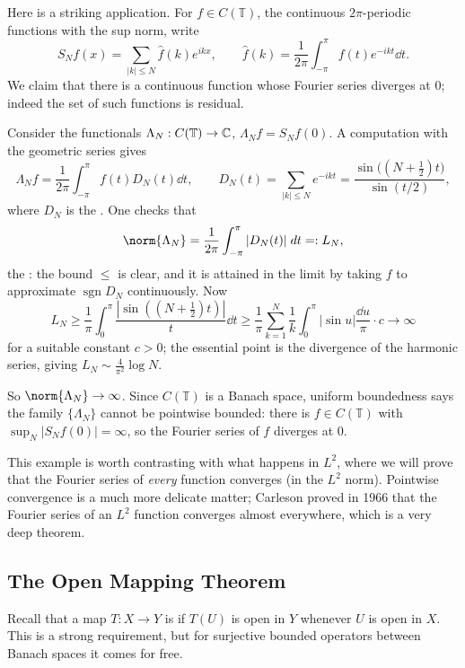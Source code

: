 \documentclass[a4paper]{scrartcl}
\DeclareMathOperator{\sgn}{sgn}
\begin{document}
\begin{example}
	Here is a striking application. For $f \in C(\mathbb{T})$, the continuous $2\pi$-periodic functions with the sup norm, write
	$$S_N f(x) = \sum_{|k| \leq N} \hat f(k) e^{ikx}, \qquad \hat f(k) = \frac{1}{2\pi}\int_{-\pi}^{\pi} f(t)e^{-ikt}\dd t.$$
	We claim that there is a continuous function whose Fourier series diverges at $0$; indeed the set of such functions is residual.

	Consider the functionals $\Lambda_N : C(\mathbb{T}) \to \mathbb{C}$, $\Lambda_N f = S_Nf(0)$. A computation with the geometric series gives
	$$\Lambda_N f = \frac{1}{2\pi}\int_{-\pi}^\pi f(t) D_N(t) \dd t, \qquad D_N(t) = \sum_{|k|\leq N}e^{-ikt} = \frac{\sin\big((N+\frac12)t\big)}{\sin(t/2)},$$
	where $D_N$ is the . One checks that
	$$\norm{\Lambda_N} = \frac{1}{2\pi}\int_{-\pi}^{\pi}|D_N(t)|\dd t =: L_N,$$
	the : the bound $\leq$ is clear, and it is attained in the limit by taking $f$ to approximate $\sgn D_N$ continuously. Now
	$$L_N \geq \frac{1}{\pi}\int_0^{\pi} \frac{|\sin((N+\frac12)t)|}{t}\dd t \geq \frac{1}{\pi}\sum_{k=1}^{N}\frac{1}{k}\int_{0}^{\pi}|\sin u| \frac{\dd u}{\pi} \cdot c \longrightarrow \infty$$
	for a suitable constant $c > 0$; the essential point is the divergence of the harmonic series, giving $L_N \sim \frac{4}{\pi^2}\log N$.

	So $\norm{\Lambda_N} \to \infty$. Since $C(\mathbb{T})$ is a Banach space, uniform boundedness says the family $\{\Lambda_N\}$ cannot be pointwise bounded: there is $f \in C(\mathbb{T})$ with $\sup_N |S_Nf(0)| = \infty$, so the Fourier series of $f$ diverges at $0$.
\end{example}

\begin{remark}
	This example is worth contrasting with what happens in $L^2$, where we will prove that the Fourier series of \emph{every} function converges (in the $L^2$ norm). Pointwise convergence is a much more delicate matter; Carleson proved in 1966 that the Fourier series of an $L^2$ function converges almost everywhere, which is a very deep theorem.
\end{remark}

\subsection{The Open Mapping Theorem}

Recall that a map $T : X \to Y$ is  if $T(U)$ is open in $Y$ whenever $U$ is open in $X$. This is a strong requirement, but for surjective bounded operators between Banach spaces it comes for free.
\end{document}

